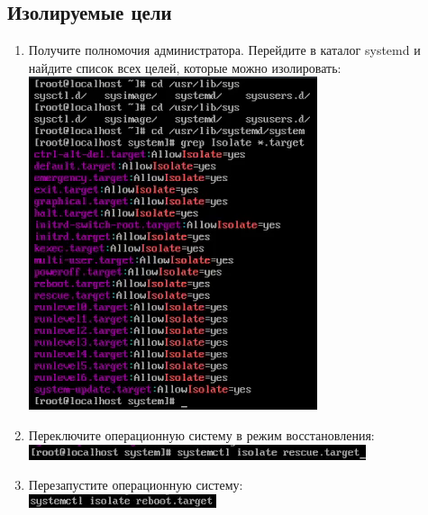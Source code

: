 \documentclass[12pt]{article}
\begin{document}
\subsection{Изолируемые цели}
\begin{enumerate}
	\item Получите полномочия администратора. Перейдите в каталог systemd и найдите список всех целей, которые можно изолировать: \\
	      \includegraphics{14.png}
	\item Переключите операционную систему в режим восстановления: \\
	      \includegraphics{15.png}
	\item Перезапустите операционную систему: \\
	      \includegraphics{16.png}
\end{enumerate}
\end{document}
